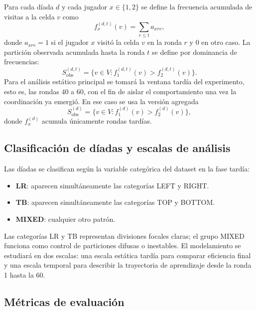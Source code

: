 \documentclass[conference]{IEEEtran}
\begin{document}
Para cada díada $d$ y cada jugador $x \in \{1,2\}$ se define la frecuencia acumulada de visitas a la celda $v$ como
\begin{equation}
f_x^{(d,t)}(v)=\sum_{r \le t} a_{xrv},
\end{equation}
donde $a_{xrv}=1$ si el jugador $x$ visitó la celda $v$ en la ronda $r$ y $0$ en otro caso. La partición observada acumulada hasta la ronda $t$ se define por dominancia de frecuencias:
\begin{equation}
S_{\mathrm{obs}}^{(d,t)}=\{v \in V : f_1^{(d,t)}(v) > f_2^{(d,t)}(v)\}.
\end{equation}
Para el análisis estático principal se tomará la ventana tardía del experimento, esto es, las rondas $40$ a $60$, con el fin de aislar el comportamiento una vez la coordinación ya emergió. En ese caso se usa la versión agregada
\begin{equation}
S_{\mathrm{obs}}^{(d)}=\{v \in V : f_1^{(d)}(v) > f_2^{(d)}(v)\},
\end{equation}
donde $f_x^{(d)}$ acumula únicamente rondas tardías.

\subsection{Clasificación de díadas y escalas de análisis}

Las díadas se clasifican según la variable categórica del dataset en la fase tardía:
\begin{itemize}
    \item \textbf{LR}: aparecen simultáneamente las categorías LEFT y RIGHT.
    \item \textbf{TB}: aparecen simultáneamente las categorías TOP y BOTTOM.
    \item \textbf{MIXED}: cualquier otro patrón.
\end{itemize}
Las categorías LR y TB representan divisiones focales claras; el grupo MIXED funciona como control de particiones difusas o inestables. El modelamiento se estudiará en dos escalas: una escala estática tardía para comparar eficiencia final y una escala temporal para describir la trayectoria de aprendizaje desde la ronda 1 hasta la 60.

\subsection{Métricas de evaluación}
\end{document}
